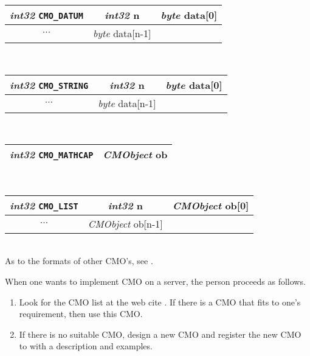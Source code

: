 \begin{tabular}{|c|c|c|}
\hline
{\sl int32} {\tt CMO\_DATUM}& {\sl int32} {\rm n} & {\sl byte} {\rm  data[0]} \\
\hline
$\cdots$ & {\sl byte} {\rm  data[n-1]} \\ 
\cline{1-2}
\end{tabular} \\
\begin{tabular}{|c|c|c|}
\hline
{\sl int32} {\tt CMO\_STRING}& {\sl int32} {\rm n} & {\sl byte} {\rm data[0]} \\
\hline
$\cdots$ & {\sl byte} {\rm data[n-1]} \\ 
\cline{1-2}
\end{tabular} \\
\begin{tabular}{|c|c|}
\hline
{\sl int32} {\tt CMO\_MATHCAP} & {\sl CMObject} {\rm ob} \\ 
\hline
\end{tabular} \\
\begin{tabular}{|c|c|c|}
\hline
{\sl int32} {\tt CMO\_LIST}& {\sl int32} {\rm n} & {\sl CMObject} {\rm ob[0]} \\
\hline
$\cdots$ & {\sl CMObject} {\rm ob[n-1]} \\ 
\cline{1-2}
\end{tabular} \\

As to the formats of other CMO's, see \cite{noro-takayama}.

When one wants to implement CMO on a server, the person proceeds 
as follows.
\begin{enumerate}
\item Look for the CMO list at the web cite \cite{openxm-web}.
If there is a CMO that fits to one's requirement, then use this CMO.     
\item If there is no suitable CMO, design a new CMO and register 
the new CMO to \cite{openxm-web} with a description and examples.
\end{enumerate}
